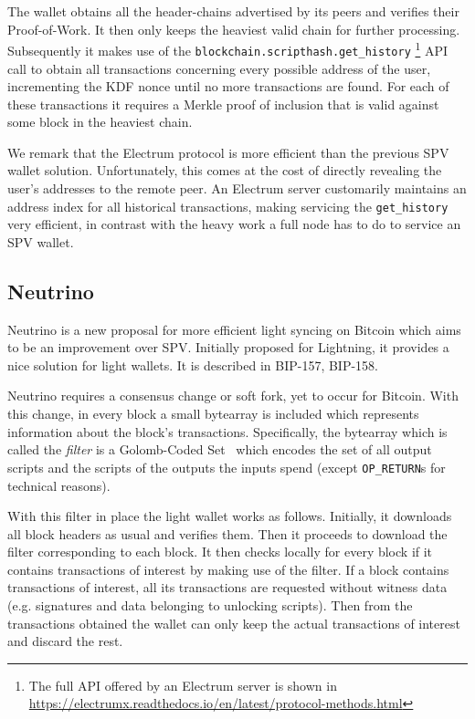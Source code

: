 \documentclass[sigconf,authordraft]{acmart}
\begin{document}
The wallet obtains all the header-chains advertised by its peers and verifies their Proof-of-Work. It then only keeps the heaviest valid chain for further processing. Subsequently it makes use of the \texttt{block\-chain.\allowbreak script\-hash.\allowbreak get\_history}
\footnote{The full API offered by an Electrum server is shown in \url{https://electrumx.readthedocs.io/en/latest/protocol-methods.html}}
API call to obtain all transactions concerning every possible address of the user, incrementing the KDF nonce until no more transactions are found. For each of these transactions it requires a Merkle proof of inclusion that is valid against some block in the heaviest chain.

We remark that the Electrum protocol is more efficient than the previous SPV wallet solution. Unfortunately, this comes at the cost of directly revealing the user's addresses to the remote peer. An Electrum server customarily maintains an address index for all historical transactions, making servicing the \texttt{get\_history} very efficient, in contrast with the heavy work a full node has to do to service an SPV wallet.
\subsection{Neutrino}
Neutrino is a new proposal for more efficient light syncing on Bitcoin which aims to be an improvement over SPV. Initially proposed for Lightning, it provides a nice solution for light wallets. It is described in BIP-157, BIP-158.

Neutrino requires a consensus change or soft fork, yet to occur for Bitcoin. With this change, in every block a small bytearray is included which represents information about the block's transactions. Specifically, the bytearray which is called the \emph{filter} is a Golomb-Coded Set~\cite{golomb1966run}
which encodes the set of all output scripts and the scripts of the outputs the inputs spend (except \texttt{OP\_RETURN}s for technical reasons).

With this filter in place the light wallet works as follows. Initially, it downloads all block headers as usual and verifies them. Then it proceeds to download the filter corresponding to each block. It then checks locally for every block if it contains transactions of interest by making use of the filter. If a block contains transactions of interest, all its transactions are requested without witness data (e.g. signatures and data belonging to unlocking scripts). Then from the transactions obtained the wallet can only keep the actual transactions of interest and discard the rest.
\end{document}
